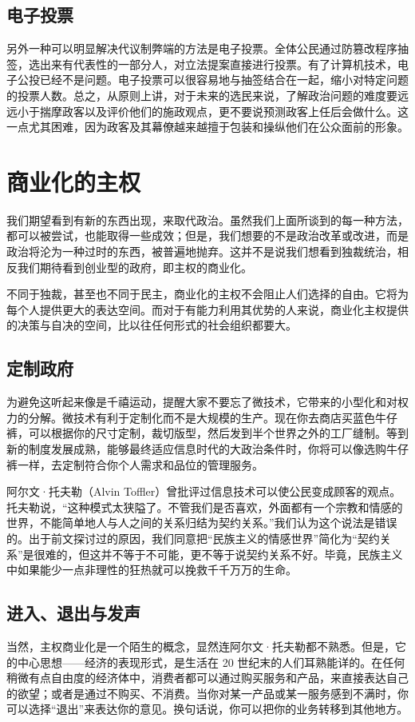 \subsection{电子投票}
另外一种可以明显解决代议制弊端的方法是电子投票。全体公民通过防篡改程序抽签，选出来有代表性的一部分人，对立法提案直接进行投票。有了计算机技术，电子公投已经不是问题。电子投票可以很容易地与抽签结合在一起，缩小对特定问题的投票人数。总之，从原则上讲，对于未来的选民来说，了解政治问题的难度要远远小于揣摩政客以及评价他们的施政观点，更不要说预测政客上任后会做什么。这一点尤其困难，因为政客及其幕僚越来越擅于包装和操纵他们在公众面前的形象。

\section{商业化的主权}
我们期望看到有新的东西出现，来取代政治。虽然我们上面所谈到的每一种方法，都可以被尝试，也能取得一些成效；但是，我们想要的不是政治改革或改进，而是政治将沦为一种过时的东西，被普遍地抛弃。这并不是说我们想看到独裁统治，相反我们期待看到创业型的政府，即主权的商业化。

不同于独裁，甚至也不同于民主，商业化的主权不会阻止人们选择的自由。它将为每个人提供更大的表达空间。而对于有能力利用其优势的人来说，商业化主权提供的决策与自决的空间，比以往任何形式的社会组织都要大。

\subsection{定制政府}
为避免这听起来像是千禧运动，提醒大家不要忘了微技术，它带来的小型化和对权力的分解。微技术有利于定制化而不是大规模的生产。现在你去商店买蓝色牛仔裤，可以根据你的尺寸定制，裁切版型，然后发到半个世界之外的工厂缝制。等到新的制度发展成熟，能够最终适应信息时代的大政治条件时，你将可以像选购牛仔裤一样，去定制符合你个人需求和品位的管理服务。

阿尔文·托夫勒（Alvin Toffler）曾批评过信息技术可以使公民变成顾客的观点。托夫勒说，“这种模式太狭隘了。不管我们是否喜欢，外面都有一个宗教和情感的世界，不能简单地人与人之间的关系归结为契约关系。”我们认为这个说法是错误的。出于前文探讨过的原因，我们同意把“民族主义的情感世界”简化为“契约关系”是很难的，但这并不等于不可能，更不等于说契约关系不好。毕竟，民族主义中如果能少一点非理性的狂热就可以挽救千千万万的生命。

\subsection{进入、退出与发声}
当然，主权商业化是一个陌生的概念，显然连阿尔文·托夫勒都不熟悉。但是，它的中心思想——经济的表现形式，是生活在 20 世纪末的人们耳熟能详的。在任何稍微有点自由度的经济体中，消费者都可以通过购买服务和产品，来直接表达自己的欲望；或者是通过不购买、不消费。当你对某一产品或某一服务感到不满时，你可以选择“退出”来表达你的意见。换句话说，你可以把你的业务转移到其他地方。

